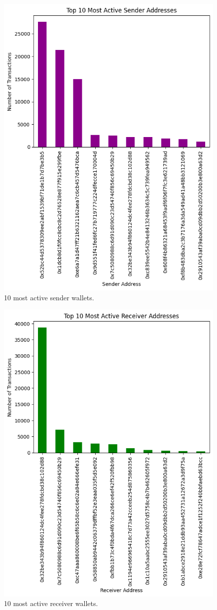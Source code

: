 \documentclass[sigconf]{acmart}
\begin{document}
\begin{figure}[H]
    \centering
    \includegraphics[width=0.8\linewidth]{M4-active-sender.png}
    \caption{10 most active sender wallets.}
    \label{fig:activeSenders}
\end{figure}

\begin{figure}[H]
    \centering
    \includegraphics[width=0.8\linewidth]{M4-active-receiver.png}
    \caption{10 most active receiver wallets.}
    \label{fig:activeReceivers}
\end{figure}
\end{document}

